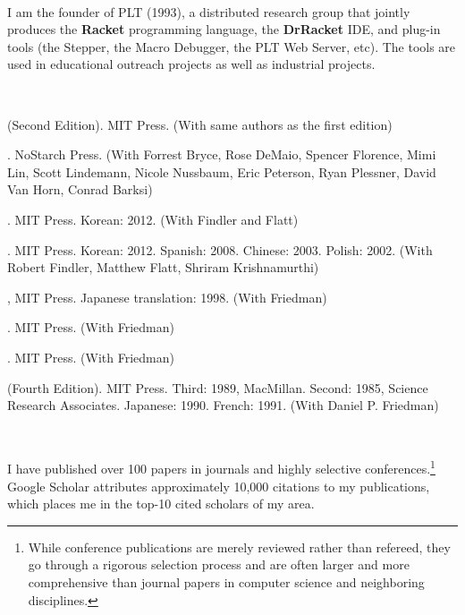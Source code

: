 \documentclass[11pt]{article}
\begin{document}
\bigskip

\noindent\hrulefill\\\noindent 
{} I am the
founder of PLT (1993), a distributed research group that jointly produces
the {\bf Racket} programming language, the {\bf DrRacket} IDE, and plug-in
tools (the Stepper, the Macro Debugger, the PLT Web Server, 
etc).  The tools are used in educational outreach projects as well as
industrial projects.

\bigskip

\noindent\hrulefill\\\noindent
{}

 (Second Edition). MIT Press. 
(With same authors as the first edition)

. NoStarch Press.
(With Forrest Bryce, Rose DeMaio, Spencer Florence, Mimi Lin, Scott
Lindemann, Nicole Nussbaum, Eric Peterson, Ryan Plessner, David Van Horn,
Conrad Barksi)

. MIT Press. 
Korean: 2012.
(With Findler and Flatt)

. MIT Press. 
Korean: 2012.
Spanish: 2008.
Chinese: 2003. 
Polish: 2002.
(With Robert Findler, Matthew Flatt, Shriram Krishnamurthi)

, MIT Press. Japanese
translation: 1998. (With Friedman) 

. MIT Press. (With Friedman)

. MIT Press. (With Friedman)

  (Fourth Edition).  MIT Press. 
Third: 1989, MacMillan. 
Second: 1985, Science Research Associates.
Japanese: 1990.
French: 1991.
(With Daniel P. Friedman)

\noindent\hrulefill\\\noindent
{} 

\noindent I have published over 100 papers in journals and highly selective
conferences.\footnote{While conference publications are merely reviewed
rather than refereed, they go through a rigorous selection process and are
often larger and more comprehensive than journal papers in computer science
and neighboring disciplines.} Google Scholar attributes approximately
10,000 citations to my publications, which places me in the top-10 cited
scholars of my area.\\
\end{document}
